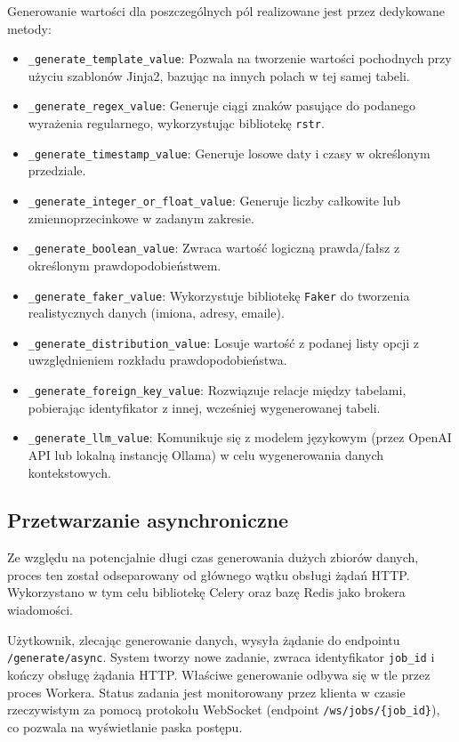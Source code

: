 Generowanie wartości dla poszczególnych pól realizowane jest przez dedykowane metody:
\begin{itemize}
    \item \texttt{\_generate\_template\_value}: Pozwala na tworzenie wartości pochodnych przy użyciu szablonów Jinja2, bazując na innych polach w tej samej tabeli.
    \item \texttt{\_generate\_regex\_value}: Generuje ciągi znaków pasujące do podanego wyrażenia regularnego, wykorzystując bibliotekę \texttt{rstr}.
    \item \texttt{\_generate\_timestamp\_value}: Generuje losowe daty i czasy w określonym przedziale.
    \item \texttt{\_generate\_integer\_or\_float\_value}: Generuje liczby całkowite lub zmiennoprzecinkowe w zadanym zakresie.
    \item \texttt{\_generate\_boolean\_value}: Zwraca wartość logiczną prawda/fałsz z określonym prawdopodobieństwem.
    \item \texttt{\_generate\_faker\_value}: Wykorzystuje bibliotekę \texttt{Faker} do tworzenia realistycznych danych (imiona, adresy, emaile).
    \item \texttt{\_generate\_distribution\_value}: Losuje wartość z podanej listy opcji z uwzględnieniem rozkładu prawdopodobieństwa.
    \item \texttt{\_generate\_foreign\_key\_value}: Rozwiązuje relacje między tabelami, pobierając identyfikator z innej, wcześniej wygenerowanej tabeli.
    \item \texttt{\_generate\_llm\_value}: Komunikuje się z modelem językowym (przez OpenAI \gls{API} lub lokalną instancję Ollama) w celu wygenerowania danych kontekstowych.
\end{itemize}

\subsection*{Przetwarzanie asynchroniczne}
Ze względu na potencjalnie długi czas generowania dużych zbiorów danych, proces ten został odseparowany od głównego wątku obsługi żądań \gls{HTTP}. Wykorzystano w tym celu bibliotekę Celery oraz bazę Redis jako brokera wiadomości.

Użytkownik, zlecając generowanie danych, wysyła żądanie do endpointu \texttt{/generate/async}. System tworzy nowe zadanie, zwraca identyfikator \texttt{job\_id} i kończy obsługę żądania \gls{HTTP}. Właściwe generowanie odbywa się w tle przez proces Workera. Status zadania jest monitorowany przez klienta w czasie rzeczywistym za pomocą protokołu WebSocket (endpoint \texttt{/ws/jobs/\{job\_id\}}), co pozwala na wyświetlanie paska postępu.

